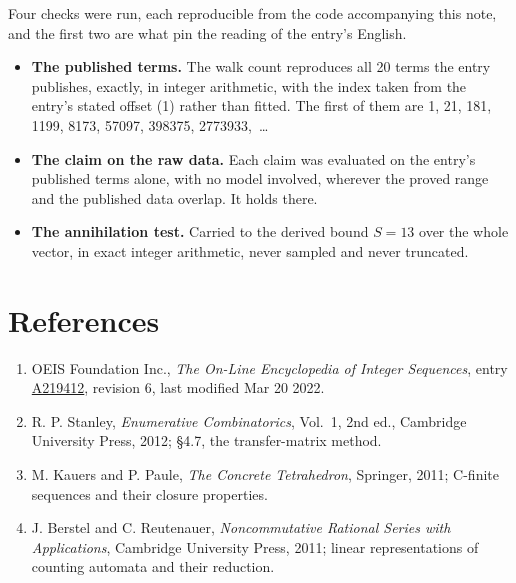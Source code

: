 \documentclass[11pt]{article}
\theoremstyle{definition}
\begin{document}
Four checks were run, each reproducible from the code accompanying this note, and the first two are what pin the reading of the entry's English.

\begin{itemize}

\item {\bfseries The published terms.} The walk count reproduces all 20 terms the entry publishes, exactly, in integer arithmetic, with the index taken from the entry's stated offset (1) rather than fitted. The first of them are 1, 21, 181, 1199, 8173, 57097, 398375, 2773933,~\dots

\item {\bfseries The claim on the raw data.} Each claim was evaluated on the entry's published terms alone, with no model involved, wherever the proved range and the published data overlap. It holds there.

\item {\bfseries The annihilation test.} Carried to the derived bound $S = 13$ over the whole vector, in exact integer arithmetic, never sampled and never truncated.

\end{itemize}

\section{References}

\begin{enumerate}

\item OEIS Foundation Inc., \emph{The On-Line Encyclopedia of Integer Sequences}, entry \href{https://oeis.org/A219412}{A219412}, revision 6, last modified Mar 20 2022.

\item R. P. Stanley, \emph{Enumerative Combinatorics}, Vol.~1, 2nd ed., Cambridge University Press, 2012; \S4.7, the transfer-matrix method.

\item M. Kauers and P. Paule, \emph{The Concrete Tetrahedron}, Springer, 2011; C-finite sequences and their closure properties.

\item J. Berstel and C. Reutenauer, \emph{Noncommutative Rational Series with Applications}, Cambridge University Press, 2011; linear representations of counting automata and their reduction.

\end{enumerate}
\end{document}
